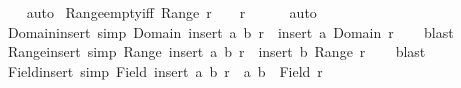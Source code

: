 \begin{isabellebody}
%
\isadelimproof
\ \ %
\endisadelimproof
%
\isatagproof
{}\isamarkupfalse%
\ auto%
\endisatagproof
{\isafoldproof}%
%
\isadelimproof
\isanewline
%
\endisadelimproof
\isanewline
{}\isamarkupfalse%
\ Range{\isacharunderscore}{\kern0pt}empty{\isacharunderscore}{\kern0pt}iff{\isacharcolon}{\kern0pt}\ {\isachardoublequoteopen}Range\ r\ {\isacharequal}{\kern0pt}\ {\isacharbraceleft}{\kern0pt}{\isacharbraceright}{\kern0pt}\ {\isasymlongleftrightarrow}\ r\ {\isacharequal}{\kern0pt}\ {\isacharbraceleft}{\kern0pt}{\isacharbraceright}{\kern0pt}{\isachardoublequoteclose}\isanewline
%
\isadelimproof
\ \ %
\endisadelimproof
%
\isatagproof
{}\isamarkupfalse%
\ auto%
\endisatagproof
{\isafoldproof}%
%
\isadelimproof
\isanewline
%
\endisadelimproof
\isanewline
{}\isamarkupfalse%
\ Domain{\isacharunderscore}{\kern0pt}insert\ {\isacharbrackleft}{\kern0pt}simp{\isacharbrackright}{\kern0pt}{\isacharcolon}{\kern0pt}\ {\isachardoublequoteopen}Domain\ {\isacharparenleft}{\kern0pt}insert\ {\isacharparenleft}{\kern0pt}a{\isacharcomma}{\kern0pt}\ b{\isacharparenright}{\kern0pt}\ r{\isacharparenright}{\kern0pt}\ {\isacharequal}{\kern0pt}\ insert\ a\ {\isacharparenleft}{\kern0pt}Domain\ r{\isacharparenright}{\kern0pt}{\isachardoublequoteclose}\isanewline
%
\isadelimproof
\ \ %
\endisadelimproof
%
\isatagproof
{}\isamarkupfalse%
\ blast%
\endisatagproof
{\isafoldproof}%
%
\isadelimproof
\isanewline
%
\endisadelimproof
\isanewline
{}\isamarkupfalse%
\ Range{\isacharunderscore}{\kern0pt}insert\ {\isacharbrackleft}{\kern0pt}simp{\isacharbrackright}{\kern0pt}{\isacharcolon}{\kern0pt}\ {\isachardoublequoteopen}Range\ {\isacharparenleft}{\kern0pt}insert\ {\isacharparenleft}{\kern0pt}a{\isacharcomma}{\kern0pt}\ b{\isacharparenright}{\kern0pt}\ r{\isacharparenright}{\kern0pt}\ {\isacharequal}{\kern0pt}\ insert\ b\ {\isacharparenleft}{\kern0pt}Range\ r{\isacharparenright}{\kern0pt}{\isachardoublequoteclose}\isanewline
%
\isadelimproof
\ \ %
\endisadelimproof
%
\isatagproof
{}\isamarkupfalse%
\ blast%
\endisatagproof
{\isafoldproof}%
%
\isadelimproof
\isanewline
%
\endisadelimproof
\isanewline
{}\isamarkupfalse%
\ Field{\isacharunderscore}{\kern0pt}insert\ {\isacharbrackleft}{\kern0pt}simp{\isacharbrackright}{\kern0pt}{\isacharcolon}{\kern0pt}\ {\isachardoublequoteopen}Field\ {\isacharparenleft}{\kern0pt}insert\ {\isacharparenleft}{\kern0pt}a{\isacharcomma}{\kern0pt}\ b{\isacharparenright}{\kern0pt}\ r{\isacharparenright}{\kern0pt}\ {\isacharequal}{\kern0pt}\ {\isacharbraceleft}{\kern0pt}a{\isacharcomma}{\kern0pt}\ b{\isacharbraceright}{\kern0pt}\ {\isasymunion}\ Field\ r{\isachardoublequoteclose}\isanewline

\end{isabellebody}
